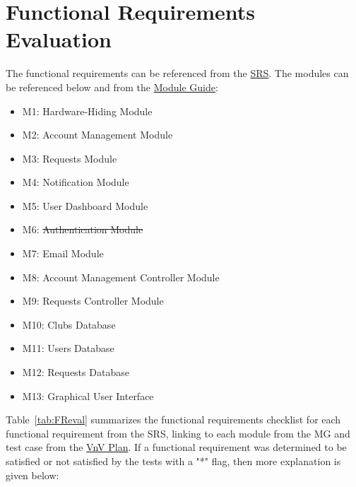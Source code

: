 \documentclass[12pt, titlepage]{article}
\begin{document}
\newpage

\section{Functional Requirements Evaluation}

The functional requirements can be referenced from the \href{https://github.com/ausbennett/mes-finance-platform/blob/main/docs/SRS/SRS.pdf}{SRS}. The modules can be referenced below and from the \href{https://github.com/ausbennett/mes-finance-platform/blob/main/docs/Design/SoftArchitecture/MG.pdf}{Module Guide}:

\begin{itemize}
    \item M1: Hardware-Hiding Module
    \item M2: Account Management Module
    \item M3: Requests Module
    \item M4: Notification Module
    \item M5: User Dashboard Module
    \item M6: \st{Authentication Module}
    \item M7: Email Module
    \item M8: Account Management Controller Module
    \item M9: Requests Controller Module
    \item M10: Clubs Database
    \item M11: Users Database
    \item M12: Requests Database
    \item M13: Graphical User Interface
\end{itemize}

Table~\ref{tab:FReval} summarizes the functional requirements checklist for each functional requirement from the SRS, linking to each module from the MG and test case from the \href{https://github.com/ausbennett/mes-finance-platform/blob/main/docs/VnVPlan/VnVPlan.pdf}{VnV Plan}. If a functional requirement was determined to be satisfied or not satisfied by the tests with a "*" flag, then more explanation is given below:
\end{document}
